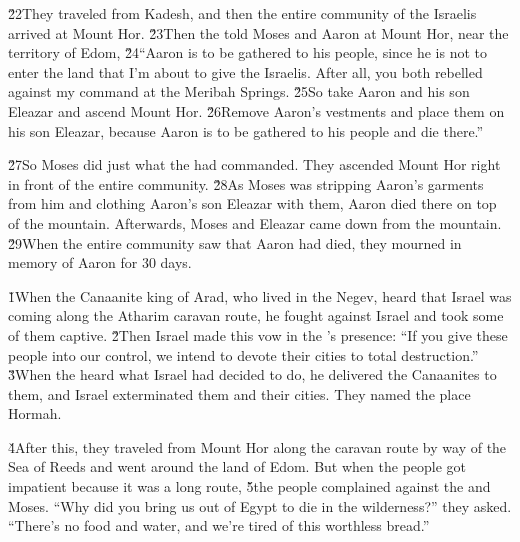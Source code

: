 \v{22}They traveled from Kadesh, and then the entire community of the Israelis arrived at Mount Hor. \v{23}Then the  told Moses and Aaron at Mount Hor, near the territory of Edom, \v{24}``Aaron is to be gathered to his people, since he is not to enter the land that I'm about to give the Israelis. After all, you both rebelled against my command at the Meribah Springs. \v{25}So take Aaron and his son Eleazar and ascend Mount Hor. \v{26}Remove Aaron's vestments and place them on his son Eleazar, because Aaron is to be gathered to his people and die there.''

\v{27}So Moses did just what the  had commanded. They ascended Mount Hor right in front of the entire community. \v{28}As Moses was stripping Aaron's garments from him and clothing Aaron's son Eleazar with them, Aaron died there on top of the mountain. Afterwards, Moses and Eleazar came down from the mountain. \v{29}When the entire community saw that Aaron had died, they mourned in memory of Aaron for 30 days.

\v{1}When the Canaanite king of Arad, who lived in the Negev, heard that Israel was coming along the Atharim caravan route, he fought against Israel and took some of them captive. \v{2}Then Israel made this vow in the 's presence: ``If you give these people into our control, we intend to devote their cities to total destruction.'' \v{3}When the  heard what Israel had decided to do, he delivered the Canaanites to them, and Israel exterminated them and their cities. They named the place Hormah.

\v{4}After this, they traveled from Mount Hor along the caravan route by way of the Sea of Reeds and went around the land of Edom. But when the people got impatient because it was a long route, \v{5}the people complained against the  and Moses. ``Why did you bring us out of Egypt to die in the wilderness?'' they asked. ``There's no food and water, and we're tired of this worthless bread.''

